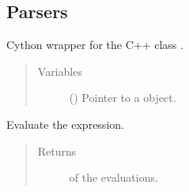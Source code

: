 \documentclass[letterpaper,10pt,english]{sphinxmanual}
\begin{document}
\begin{fulllineitems}
\begin{fulllineitems}
\begin{quote}
\begin{description}
\end{description}\end{quote}

\end{fulllineitems}


\end{fulllineitems}



\subsection{Parsers}
\label{\detokenize{api:parsers}}

\begin{fulllineitems}
\label{\detokenize{api:grids.parser.parser_1d.Parser1d}}
Cython wrapper for the C++ class .
\begin{quote}\begin{description}
\item[{Variables}] \leavevmode
{} () \textendash{} Pointer to a  object.

\end{description}\end{quote}

\begin{fulllineitems}
\label{\detokenize{api:grids.parser.parser_1d.Parser1d.evaluate}}
Evaluate the expression.
\begin{quote}\begin{description}
\item[{Returns}] \leavevmode
{} of the evaluations.

\end{description}\end{quote}

\end{fulllineitems}


\end{fulllineitems}

\end{document}
